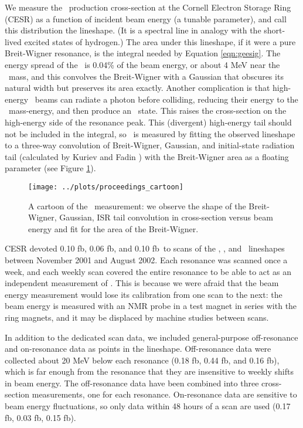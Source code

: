 \documentclass[aps,prd,preprint,superscriptaddress,tightenlines,nofootinbib,floatfix]{revtex4}
\begin{document}
We measure the \ups\ production cross-section at the Cornell Electron
Storage Ring (CESR) as a function of incident beam energy (a tunable
parameter), and call this distribution the lineshape.  (It is a
spectral line in analogy with the short-lived excited states of
hydrogen.)  The area under this lineshape, if it were a pure
Breit-Wigner resonance, is the integral needed by Equation
\ref{eqn:geesig}.  The energy spread of the \ee\ is 0.04\% of the beam energy, or about 4
MeV near the \ups\ mass, and this convolves the Breit-Wigner with a
Gaussian that obscures its natural width but preserves its area
exactly.  Another complication is that high-energy \ee\ beams can
radiate a photon before colliding, reducing their energy to the \ups\
mass-energy, and then produce an \ups\ state.  This raises the cross-section
on the high-energy side of the resonance peak.  This (divergent)
high-energy tail should not be included in the integral, so \gee\ is
measured by fitting the observed lineshape to a three-way convolution
of Breit-Wigner, Gaussian, and initial-state radiation tail
(calculated by Kuriev and Fadin \cite{kf}) \cite{kb} with the Breit-Wigner area
as a floating parameter (see Figure \ref{fig:cartoon}).

\begin{figure}[t]
  \begin{center}
    \texttt{[image: ../plots/proceedings\_cartoon]}
  \end{center}
  \caption{\label{fig:cartoon} A cartoon of the \gee\ measurement: we
    observe the shape of the Breit-Wigner, Gaussian, ISR tail
    convolution in cross-section versus beam energy and fit for the
    area of the Breit-Wigner.}
\end{figure}

CESR devoted 0.10 fb\inv, 0.06 fb\inv, and 0.10 fb\inv\ to scans of
the \uone, \utwo, and \uthree\ lineshapes between November 2001 and
August 2002.  Each resonance was scanned once a week, and each
weekly scan covered the entire resonance to be able to act as an
independent measurement of \gee.  This is because we were afraid that
the beam energy measurement would lose its calibration from one scan
to the next: the beam energy is measured with an NMR probe in a test
magnet in series with the ring magnets, and it may be displaced by
machine studies between scans.

In addition to the dedicated scan data, we included general-purpose
off-resonance and on-resonance data as points in the lineshape.
Off-resonance data were collected about 20 MeV below each resonance
(0.18 fb\inv, 0.44 fb\inv, and 0.16 fb\inv), which is far enough from
the resonance that they are insensitive to weekly shifts in beam
energy.  The off-resonance data have been combined into three
cross-section measurements, one for each resonance.  On-resonance data
are sensitive to beam energy fluctuations, so only data within 48
hours of a scan are used (0.17 fb\inv, 0.03 fb\inv, 0.15 fb\inv).
\end{document}
